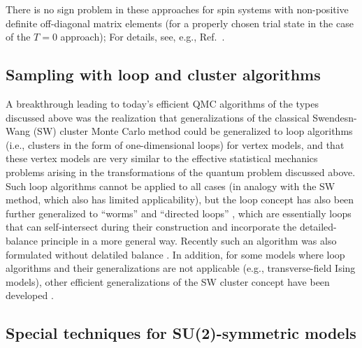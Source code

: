 \documentclass[range]{ar2e}
\begin{document}
There is no sign problem in these approaches for spin systems with non-positive definite off-diagonal matrix elements (for a properly chosen trial state in the case of the $T=0$ approach); For details, see, e.g., Ref.~\cite{Henelius00}.

\subsection{Sampling with loop and cluster algorithms}

A breakthrough leading to today's efficient QMC algorithms of the types discussed above
was the realization \cite{Evertz93} that generalizations of the classical Swendesn-Wang (SW) cluster 
Monte Carlo method \cite{Swendsen88} could be generalized to loop algorithms (i.e., clusters in the form of one-dimensional loops) for vertex models, and that 
these vertex models are very similar to the effective statistical mechanics problems arising in the transformations of the quantum problem discussed above. Such 
loop algorithms cannot be applied to all cases (in analogy with the SW method, which also has limited applicability), but the loop concept has also been further 
generalized to ``worms'' \cite{Prokofev96,Prokofev98, WormA} and ``directed loops'' \cite{Sandvik99,Syljuasen02}, which are essentially loops that can self-intersect
during their construction and incorporate the detailed-balance principle in a more general way. Recently such an algorithm was also formulated without
delatiled balance \cite{Suwa10}. In addition, for some models where loop algorithms and their generalizations are not applicable (e.g., transverse-field 
Ising models), other efficient generalizations of the SW cluster concept have been developed \cite{Rieger99,Sandvik03}.

\subsection{Special techniques for SU(2)-symmetric models}
\label{su2method}
\end{document}
